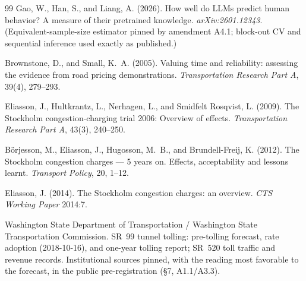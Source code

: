 \documentclass[11pt]{article}
\begin{document}
\begin{thebibliography}{99}
Gao, W., Han, S., and Liang, A. (2026).
How well do LLMs predict human behavior? A measure of their pretrained
knowledge.
\emph{arXiv:2601.12343}. (Equivalent-sample-size estimator pinned by
amendment A4.1; block-out CV and sequential inference used exactly as
published.)

Brownstone, D., and Small, K.~A. (2005).
Valuing time and reliability: assessing the evidence from road pricing
demonstrations.
\emph{Transportation Research Part A}, 39(4), 279--293.

Eliasson, J., Hultkrantz, L., Nerhagen, L., and Smidfelt Rosqvist, L.
(2009).
The Stockholm congestion-charging trial 2006: Overview of effects.
\emph{Transportation Research Part A}, 43(3), 240--250.

B{\"o}rjesson, M., Eliasson, J., Hugosson, M.~B., and Brundell-Freij,
K. (2012).
The Stockholm congestion charges --- 5 years on. Effects,
acceptability and lessons learnt.
\emph{Transport Policy}, 20, 1--12.

Eliasson, J. (2014).
The Stockholm congestion charges: an overview.
\emph{CTS Working Paper} 2014:7.

Washington State Department of Transportation / Washington State
Transportation Commission.
SR~99 tunnel tolling: pre-tolling forecast, rate adoption (2018-10-16),
and one-year tolling report; SR~520 toll traffic and revenue records.
Institutional sources pinned, with the reading most favorable to the
forecast, in the public pre-registration (\S7, A1.1/A3.3).

\end{thebibliography}
\end{document}
